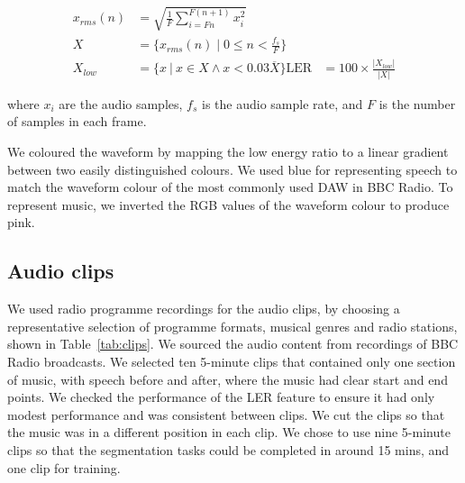 \begin{align}
  x_{rms}(n) &= \sqrt{\frac{1}{F} \displaystyle\sum\limits_{i=Fn}^{F(n+1)} x_i^2}\\
  X &= \{x_{rms}(n) \mid 0 \leq n < \frac{f_s}{F}\}\\
  X_{low} &= \{x\ | \ x \in X \wedge x < 0.03 \overline{X} \}
  \text{LER} &= 100 \times \frac{|X_{low}|}{|X|}\label{eq:ler}
\end{align}

where $x_i$ are the audio samples, $f_s$ is the audio sample rate, and $F$ is the number of samples in each frame.



We coloured the waveform by mapping the low energy ratio to a linear gradient between two easily distinguished colours.
We used blue for representing speech to match the waveform colour of the most commonly used DAW in BBC Radio. To
represent music, we inverted the RGB values of the waveform colour to produce pink.

\subsection{Audio clips}
We used radio programme recordings for the audio clips, by choosing a representative selection of programme formats,
musical genres and radio stations, shown in Table~\ref{tab:clips}.  We sourced the audio content from recordings of BBC
Radio broadcasts. We selected ten 5-minute clips that contained only one section of music, with speech before and
after, where the music had clear start and end points. We checked the performance of the LER feature to ensure it had
only modest performance and was consistent between clips. We cut the clips so that the music was in a different
position in each clip.  We chose to use nine 5-minute clips so that the segmentation tasks could be completed in around
15 mins, and one clip for training.

